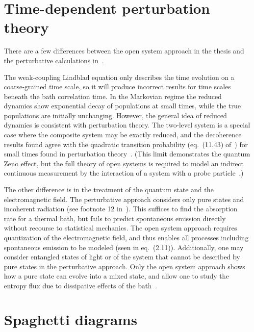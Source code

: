 \documentclass[12pt]{article}
\begin{document}
\section{Time-dependent perturbation theory}

There are a few differences between the open system approach in the thesis and
the perturbative calculations
in~\cite{griffithsIntroductionQuantumMechanics2018}.

The weak-coupling Lindblad equation only describes the time evolution on a
coarse-grained time scale, so it will produce incorrect results for time scales
beneath the bath correlation time. In the Markovian regime the reduced dynamics
show exponential decay of populations at small times, while the true populations
are initially unchanging. However, the general idea of reduced dynamics is
consistent with perturbation theory. The two-level system is a special case
where the composite system may be exactly reduced, and the decoherence results
found agree with the quadratic transition probability (eq.~(11.43)
of~\cite{griffithsIntroductionQuantumMechanics2018}) for small times found in
perturbation theory~\cite[p.~230]{opensys}. (This limit demonstrates the quantum
Zeno effect, but the full theory of open systems is required to model an
indirect continuous measurement by the interaction of a system with a probe
particle~\cite[p.~167--171]{opensys}.)

The other difference is in the treatment of the quantum state and the
electromagnetic field. The perturbative approach considers only pure states and
incoherent radiation (see footnote 12
in~\cite[p.~414]{griffithsIntroductionQuantumMechanics2018}). This suffices to
find the absorption rate for a thermal bath, but fails to predict spontaneous
emission directly without recourse to statistical mechanics. The open system
approach requires quantization of the electromagnetic field, and thus enables
all processes including spontaneous emission to be modeled (seen in eq.~(2.11)).
Additionally, one may consider entangled states of light or of the system that
cannot be described by pure states in the perturbative approach. Only the open
system approach shows how a pure state can evolve into a mixed state, and allow
one to study the entropy flux due to dissipative effects of the
bath~\cite[p.~128]{opensys}.

\section{Spaghetti diagrams}
\end{document}

